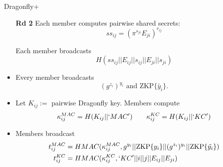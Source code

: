 \documentclass{beamer}
\theoremstyle{definition}
\begin{document}
\begin{frame}{Dragonfly+}
    \begin{itemize}
        \item[\textbf{Rd 2}] Each member computes pairwise shared secrets:
        \[ ss_{ij} = (\pi^{s_{ji}} E_{ji})^{r_{ij}} \]
        \item[] Each member broadcasts 
        \[ H(ss_{ij} || E_{ij} || s_{ij} || E_{ji} || s_{ji}) \]
        
        \item<2->[\textbf{Rd 3}] Every member broadcasts
          \[ (g^{z_i})^{y_i} \text{ and } \text{ZKP}\{\tilde{y_i}\}. \]
        \item<3->[] Let $K_{ij} := $ pairwise Dragonfly key. Members compute
            \[ \kappa_{ij}^{MAC} = H(K_{ij} || `MAC') \qquad \kappa_{ij}^{KC} = H(K_{ij} || `KC') \]
        \item<4->[] Members broadcast 
        \begin{align*}
        t_{ij}^{MAC} &= HMAC(\kappa_{ij}^{MAC},  g^{y_i} || \text{ZKP}\{y_i\} || (g^{z_i})^{y_i} || \text{ZKP}\{\tilde{y_i}\})\\
        t_{ij}^{KC} &= HMAC(\kappa_{ij}^{KC}, `KC' || i || j || E_{ij} || E_{ji})
        \end{align*}
    \end{itemize}
\end{frame}
\end{document}
